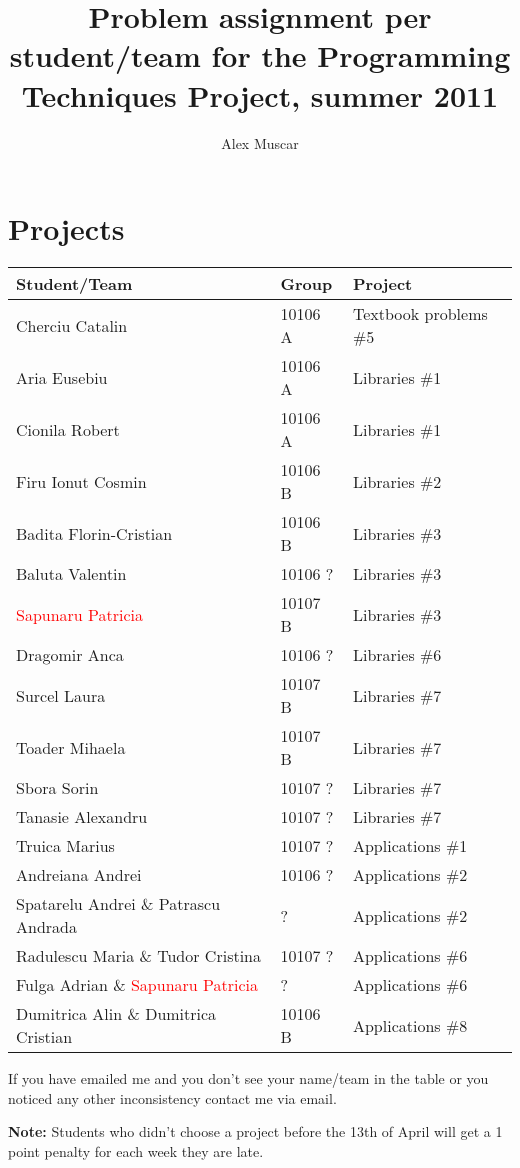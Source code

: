 \documentclass{article}
\begin{document}
\title{Problem assignment per student/team for the Programming Techniques Project, summer 2011}
\author{Alex Muscar}
\maketitle

\section{Projects}

\begin{center}
  \begin{tabular}{ | l | l | l | }
    \hline
    \textbf{Student/Team} & \textbf{Group} & \textbf{Project} \\ \hline
    Cherciu Catalin & 10106 A &Textbook problems \#5 \\ \hline
    Aria Eusebiu & 10106 A & Libraries \#1 \\ \hline
    Cionila Robert & 10106 A & Libraries \#1 \\ \hline
    Firu Ionut Cosmin & 10106 B & Libraries \#2 \\ \hline
    Badita Florin-Cristian & 10106 B & Libraries \#3 \\ \hline
    Baluta Valentin & 10106 ? & Libraries \#3 \\ \hline
    \textcolor{red}{Sapunaru Patricia} & 10107 B & Libraries \#3 \\ \hline
    Dragomir Anca & 10106 ? & Libraries \#6 \\ \hline
    Surcel Laura & 10107 B & Libraries \#7 \\ \hline
    Toader Mihaela & 10107 B & Libraries \#7 \\ \hline
    Sbora Sorin & 10107 ? & Libraries \#7 \\ \hline
    Tanasie Alexandru & 10107 ? & Libraries \#7 \\ \hline
    Truica Marius & 10107 ? & Applications \#1 \\ \hline
    Andreiana Andrei & 10106 ? & Applications \#2 \\ \hline
    Spatarelu Andrei \& Patrascu Andrada & ? & Applications \#2 \\ \hline
    Radulescu Maria \& Tudor Cristina & 10107 ? & Applications \#6 \\ \hline
    Fulga Adrian \& \textcolor{red}{Sapunaru Patricia} & ? & Applications \#6 \\ \hline
    Dumitrica Alin \& Dumitrica Cristian & 10106 B & Applications \#8 \\
    \hline
  \end{tabular}
\end{center}

If you have emailed me and you don't see your name/team in the table or you noticed any other inconsistency contact me via email.

\textbf{Note:} Students who didn't choose a project before the 13th of April will get a 1 point penalty for each week they are late.
\end{document}
